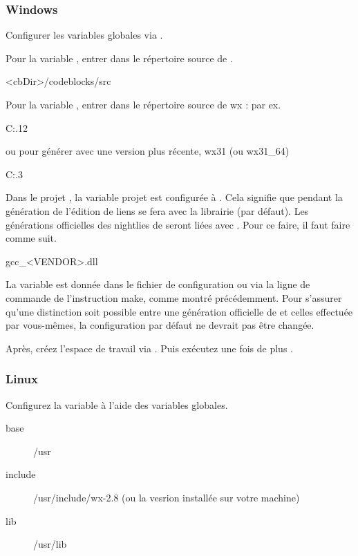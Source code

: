 \subsubsection{Windows}

Configurer les variables globales via .


Pour la variable , entrer dans  le répertoire source de \codeblocks.

\begin{cmd}
<cbDir>/codeblocks/src
\end{cmd}


Pour la variable , entrer dans  le répertoire source de wx : par ex.

\begin{cmd}
C:.12
\end{cmd}

ou pour générer avec une version plus récente, wx31 (ou wx31\_64)

\begin{cmd}
C:.3
\end{cmd}

Dans le projet \codeblocks, la variable projet  est configurée à . Cela signifie que pendant la génération de \codeblocks l'édition de liens se fera avec la librairie  (par défaut). Les générations officielles des nightlies de \codeblocks seront liées avec . Pour ce faire, il faut faire comme suit.

\begin{code}
gcc_<VENDOR>.dll
\end{code}

La variable  est donnée dans le fichier de configuration  ou via la ligne de commande de l'instruction make, comme montré précédemment. Pour s'assurer qu'une distinction soit possible entre une génération officielle de \codeblocks et celles effectuée par vous-mêmes, la configuration par défaut  ne devrait pas être changée.

Après, créez l'espace de travail  via . Puis exécutez une fois de plus .

\subsubsection{Linux}

Configurez la variable  à l'aide des variables globales.

\begin{description}
\item[base] /usr
\item[include] /usr/include/wx-2.8 (ou la vesrion installée sur votre machine)
\item[lib] /usr/lib
\end{description}


